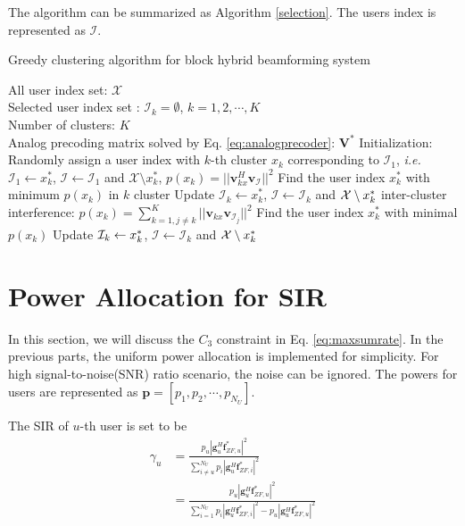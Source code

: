 \documentclass[conference]{IEEEtran}
\begin{document}
The algorithm can be summarized as Algorithm \ref{selection}. The users index is represented as $\bm{\mathcal{I}}$.
\begin{algorithm}[h] 		
	\caption{Greedy clustering algorithm for block hybrid beamforming system}
	\label{selection}
	\begin{algorithmic}
		\REQUIRE  \quad
		\STATE	All user index set: $\mathcal{X}$\\
		\STATE  Selected user index set : $\mathcal{I}_k=\emptyset$, $k=1,2,\cdots, K$\\
		\STATE  Number of clusters: $K$\\
		\STATE Analog precoding matrix solved by Eq. \eqref{eq:analogprecoder}: $\bm{V}^*$ 
		\ENSURE   	
		\STATE Initialization: Randomly assign a user index with $k$-th cluster $x_k$ corresponding to ${\mathcal I}_1$, {\em i.e.} $\mathcal{I}_1 \leftarrow  x^*_k$,  $\bm{\mathcal{I}} \leftarrow \mathcal{I}_1$ and ${\mathcal X}\setminus x_k^*$, 
		\STATE $p(x_k) = ||\bm{v}_{kx}^H \bm{v}_{\bm{\mathcal{I}}}||^2$
		\ENDFOR
		\STATE Find the user index $x_k^*$ with minimum $p(x_k)$ in $k$ cluster
		\STATE Update $\mathcal{I}_k\leftarrow x_k^*$, $\bm{\mathcal{I}}\leftarrow \mathcal{I}_k$ and  ${\cal X}\setminus x_k^*$
		\ENDWHILE
		\STATE  inter-cluster interference: $p(x_k)= \sum_{k=1,j\neq k}^{K}||\bm{v}_{kx}\bm{v}_{\mathcal{I}_j}||^2$					 								
		\ENDWHILE
		\STATE Find the user index $x_k^*$ with minimal $p(x_k)$									
		\STATE	Update ${\cal I}_k \leftarrow  x_k^*$, $\bm{\mathcal{I}}\leftarrow \mathcal{I}_k$ and ${\cal X}\setminus x_k^*$	
		\ENDFOR	
	\end{algorithmic}
\end{algorithm}
	
	
\section{Power Allocation for SIR}
In this section, we will discuss the $C_3$ constraint in Eq. \eqref{eq:maxsumrate}. In the previous parts, the uniform power allocation is implemented for simplicity. For high signal-to-noise(SNR) ratio scenario, the noise can be ignored. The powers for users are represented as $\bm{p}=[p_1, p_2, \cdots, p_{N_U}]$. 

The SIR of $u$-th user is set to be 
\begin{align}
\gamma_u &= \frac{p_u|\bm{g}_u^H\bm{f}^*_{ZF,u}|^2}{\sum_{i\neq u}^{N_U}p_i|\bm{g}_u^H \bm{f}^*_{ZF,i}|^2} \nonumber\\
&= \frac{p_u|\bm{g}_u^H\bm{f}^*_{ZF,u}|^2}{\sum_{i=1}^{N_U}p_i|\bm{g}_u^H \bm{f}^*_{ZF,i}|^2 - p_u|\bm{g}_u^H \bm{f}^*_{ZF,u}|^2}
\end{align}
\end{document}
